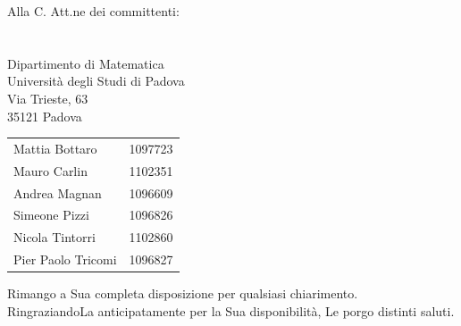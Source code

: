\documentclass[a4paper,12pt]{letteracdp}
\begin{document}
\begin{letter}{
    Alla C. Att.ne dei committenti: \\
    \COMMITTENTE \\
    \CARDIN      \\
    Dipartimento di Matematica \\
		Università degli Studi di Padova \\
		Via Trieste, 63 \\
		35121 Padova}
\begin{center}
\begin{tabular}{l c}
        Mattia Bottaro 	 	& 1097723  \\
        Mauro Carlin 	 	& 1102351  \\
        Andrea Magnan    	& 1096609  \\
        Simeone Pizzi    	& 1096826  \\
        Nicola Tintorri    	& 1102860  \\
        Pier Paolo Tricomi 	& 1096827  \\
      \end{tabular}
    \end{center}
    \closing{Rimango a Sua completa disposizione per qualsiasi chiarimento. \\
	RingraziandoLa anticipatamente per la Sua disponibilità, Le porgo distinti saluti.}
  \end{letter}
\end{document}
